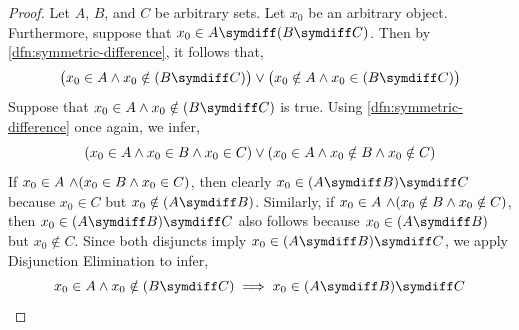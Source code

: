 \begin{proof}
    Let \( A \), \( B \), and \( C \) be arbitrary sets. Let \( x_{0} \) be an arbitrary object.
    Furthermore, suppose that \( x_{0} \in A \symdiff \mleft( B \symdiff C \mright) \).
    Then by \cref{dfn:symmetric-difference}, it follows that,
    \begin{equation}
        \label{eq:lhs-predicate-form}
        \big( x_{0} \in A \land x_{0} \notin \mleft( B \symdiff C \mright) \big)
        \lor
        \big( x_{0} \notin A \land x_{0} \in \mleft( B \symdiff C \mright) \big)
    \end{equation}
    Suppose that \( x_{0} \in A \land x_{0} \notin \mleft( B \symdiff C \mright) \) is true.
    Using \cref{dfn:symmetric-difference} once again, we infer,
    \begin{equation*}
        \mleft( x_{0} \in A \land x_{0} \in B \land x_{0} \in C \mright)
        \lor
        \mleft( x_{0} \in A \land x_{0} \notin B \land x_{0} \notin C \mright)
    \end{equation*}
    If \( x_{0} \in A \,\,{\land} \mleft( x_{0} \in B \land x_{0} \in C \mright)\),
    then clearly \( x_{0} \in \mleft( A \symdiff B \mright) \symdiff C \) because
    \( x_{0} \in C \) but \( x_{0} \notin \mleft( A \symdiff B \mright) \). Similarly, if
    \( x_{0} \in A \,\,{\land} \mleft( x_{0} \notin B \land x_{0} \notin C \mright) \),
    then \( x_{0} \in \mleft( A \symdiff B \mright) \symdiff C \) also follows because
    \( x_{0} \in \mleft( A \symdiff B \mright) \) but \( x_{0} \notin C \). Since both disjuncts
    imply \( x_{0} \in \mleft( A \symdiff B \mright) \symdiff C \), we apply Disjunction
    Elimination to infer,
    \begin{equation}
        \label{eq:left-disjunct-forward-implication}
        x_{0} \in A \land x_{0} \notin \mleft( B \symdiff C \mright)
        \implies
        x_{0} \in \mleft( A \symdiff B \mright) \symdiff C
    \end{equation}


\end{proof}
